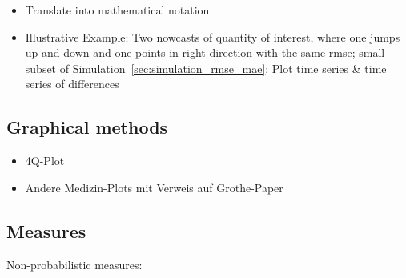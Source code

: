 \documentclass[oneside]{article}
\theoremstyle{plain}%
\theoremstyle{definition}
\newcommand{\ydiff}{\tilde{y}}
\newcommand{\xdiff}{\tilde{x}}
\begin{document}
\begin{itemize}
  \item Translate into mathematical notation
  \item Illustrative Example: Two nowcasts of quantity of interest, where one jumps up and down and one points in right direction with the same rmse; small subset of Simulation~\ref{sec:simulation_rmse_mae}; Plot time series \& time series of differences
\end{itemize}

\subsection{Graphical methods}

\begin{itemize}
  \item 4Q-Plot
  \item Andere Medizin-Plots mit Verweis auf Grothe-Paper
\end{itemize}


\subsection{Measures}


Non-probabilistic measures:
\end{document}

